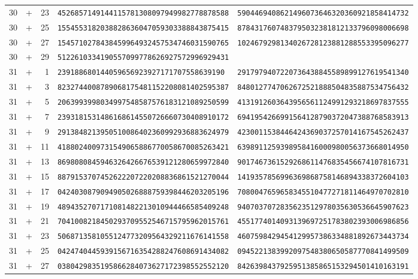 \begin{longtable}{@{}rcrll@{}}
30&+&23&\texttt{4526857149144115781308097949982778878588}&\texttt{5904469408621496073646320360921858414732}\\
30&+&25&\texttt{1554553182038828636047059303388843875415}&\texttt{8784317607483795032381812133796098006698}\\
30&+&27&\texttt{1545710278438459964932457534746031590765}&\texttt{1024679298134026728123881288553395096277}\\
30&+&29&\texttt{5122610334190557099778626927572996929431}&\texttt{}\\
31&+&1&\texttt{239188680144059656923927171707558639190}&\texttt{2917979407220736438845589899127619541340}\\
31&+&3&\texttt{8232744008789068175481152208081402595387}&\texttt{8480127747062672521888504835887534756432}\\
31&+&5&\texttt{2063993998034997548587576183121089250599}&\texttt{4131912603643956561124991293218697837555}\\
31&+&7&\texttt{2393181531486168614550726660730408910172}&\texttt{6941954266991564128790372047388768583913}\\
31&+&9&\texttt{2913848213950510086402360992936883624979}&\texttt{4230011538446424369037257014167545262437}\\
31&+&11&\texttt{4188024009731549065886770058670085263421}&\texttt{6398911259398958416000980056373668014950}\\
31&+&13&\texttt{8698080845946326426676539121280659972840}&\texttt{9017467361529268611476835456674107816731}\\
31&+&15&\texttt{8879153707452622207220208836861521270044}&\texttt{1419357856996369868758146894338372604103}\\
31&+&17&\texttt{0424030879094905026888759398446203205196}&\texttt{7080047659658345510477271811464970702810}\\
31&+&19&\texttt{4894352707171081482213010944466585409248}&\texttt{9407037072835623512978035630536645907623}\\
31&+&21&\texttt{7041008218450293709552546715795962015761}&\texttt{4551774014093139697251783802393006986856}\\
31&+&23&\texttt{5068713581055124773209564329211676141558}&\texttt{4607598429454129957386334881892673443734}\\
31&+&25&\texttt{0424740445939156716354288247608691434082}&\texttt{0945221383992097548380650587770841499509}\\
31&+&27&\texttt{0380429835195866284073627172398552552120}&\texttt{8426398437925951385865153294501410163191}\\

\end{longtable}
